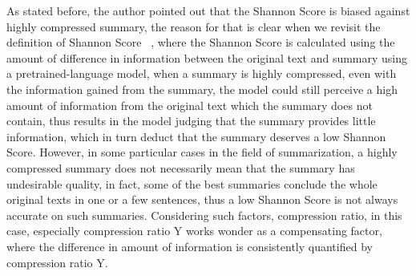 As stated before, the author pointed out that the Shannon Score is biased against highly compressed summary, the reason for that is clear when we revisit the definition of Shannon Score ~\cite{shannonscore}, where the Shannon Score is calculated using the amount of difference in information between the original text and summary using a pretrained-language model, when a summary is highly compressed, even with the information gained from the summary, the model could still perceive a high amount of information from the original text which the summary does not contain, thus results in the model judging that the summary provides little information, which in turn deduct that the summary deserves a low Shannon Score. However, in some particular cases in the field of summarization, a highly compressed summary does not necessarily mean that the summary has undesirable quality, in fact, some of the best summaries conclude the whole original texts in one or a few sentences, thus a low Shannon Score is not always accurate on such summaries. Considering such factors, compression ratio, in this case, especially compression ratio Y works wonder as a compensating factor, where the difference in amount of information is consistently quantified by compression ratio Y.

